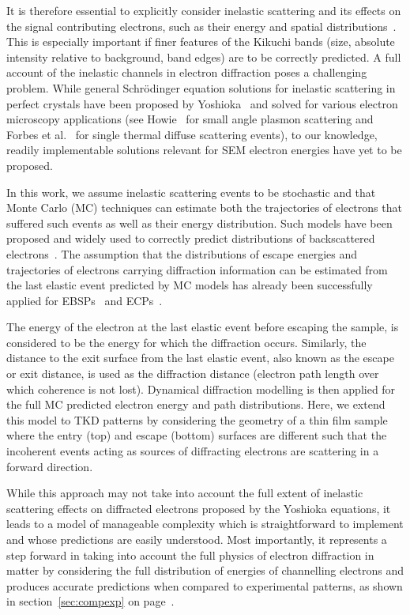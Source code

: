 It is therefore essential to explicitly consider inelastic scattering and its effects on the signal contributing electrons, such as their energy and spatial distributions~\cite{degraef2013e, winkelmann2016}. This is especially important if finer features of the Kikuchi bands (size, absolute intensity relative to background, band edges) are to be correctly predicted. A full account of the inelastic channels in electron diffraction poses a challenging problem. While general Schr\"odinger equation solutions for inelastic scattering in perfect crystals have been proposed by Yoshioka~\cite{yoshioka1957a} and solved for various electron microscopy applications (see Howie~\cite{howie1963} for small angle plasmon scattering and Forbes et al.~\cite{forbes2011} for single thermal diffuse scattering events), to our knowledge, readily implementable solutions relevant for SEM electron energies have yet to be proposed.

In this work, we assume inelastic scattering events to be stochastic and that Monte Carlo (MC) techniques can estimate both the trajectories of electrons that suffered such events as well as their energy distribution. Such models have been proposed and widely used to correctly predict distributions of backscattered electrons~\cite{joy1995a}. The assumption that the distributions of escape energies and trajectories of electrons carrying diffraction information can be estimated from the last elastic event predicted by MC models has already been successfully applied for EBSPs~\cite{degraef2013e} and ECPs~\cite{degraef2017k}. 

The energy of the electron at the last elastic event before escaping the sample, is considered to be the energy for which the diffraction occurs. Similarly, the distance to the exit surface from the last elastic event, also known as the escape or exit distance, is used as the diffraction distance (electron path length over which coherence is not lost). Dynamical diffraction modelling is then applied for the full MC predicted electron energy and path distributions. Here, we extend this model to TKD patterns by considering the geometry of a thin film sample where the entry (top) and escape (bottom) surfaces are different such that the incoherent events acting as sources of diffracting electrons are scattering in a forward direction. 

While this approach may not take into account the full extent of inelastic scattering effects on diffracted electrons proposed by the Yoshioka equations, it leads to a model of manageable complexity which is straightforward to implement and whose predictions are easily understood. Most importantly, it represents a step forward in taking into account the full physics of electron diffraction in matter by considering the full distribution of energies of channelling electrons and produces accurate predictions when compared to experimental patterns, as shown in section~\ref{sec:compexp} on page~\pageref{sec:compexp}.


